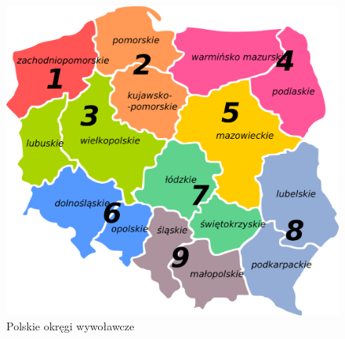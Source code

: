 \documentclass[a4paper,11pt]{article}
\begin{document}
\begin{figure}[p]
\includegraphics{Polish_HAM_Radio_Regions}
\caption{Polskie okręgi wywoławcze}
\end{figure}
\clearpage
\end{document}
